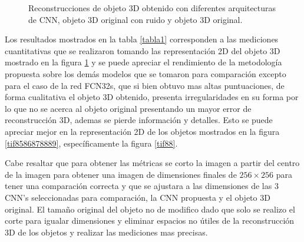 \documentclass[10pt,letterpaper]{article}
\begin{document}
\begin{figure}[H]
\begin{center}
{            \label{tif98}}
        \caption{Reconstrucciones de objeto 3D obtenido con diferentes arquitecturas de CNN, objeto 3D original con ruido y objeto 3D original.}
        \label{tif98100102104106}
      \end{center}
\end{figure}

Los resultados mostrados en la tabla \ref{tabla1} corresponden a las mediciones cuantitativas que se realizaron tomando las representación 2D del objeto 3D mostrado en la figura \ref{tif98100102104106} y se puede apreciar el rendimiento de la metodología propuesta sobre los demás modelos que se tomaron para comparación excepto para el caso de la red FCN32s, que si bien obtuvo mas altas puntuaciones, de forma cualitativa el objeto 3D obtenido, presenta irregularidades en su forma por lo que no se acerca al objeto original presentando un mayor error de reconstrucción 3D, ademas se pierde información y detalles. Esto se puede apreciar mejor en la representación 2D de los objetos mostrados en la figura \ref{tif8586878889}, específicamente la figura \ref{tif88}. 

Cabe resaltar que para obtener las métricas se corto la imagen a partir del centro de la imagen para obtener una imagen de dimensiones finales de $256 \times 256$ para tener una comparación correcta y que se ajustara a las dimensiones de las 3 CNN's seleccionadas para comparación, la CNN propuesta y el objeto 3D original. El tamaño original del objeto no de modifico dado que solo se realizo el corte para igualar dimensiones y eliminar espacios no útiles de la reconstrucción 3D de los objetos y realizar las mediciones mas precisas.
 
\end{document}

